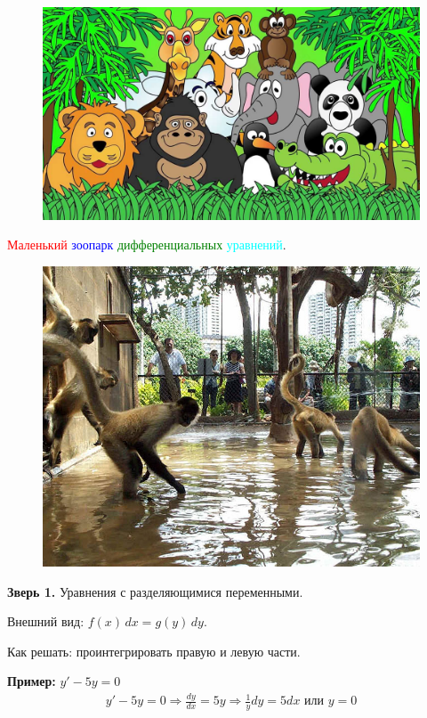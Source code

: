 \documentclass[10pt, a4paper]{article}
\begin{document}
\pagecolor{Tan}
\begin{figure}[h]
\centerline{\includegraphics[width=14cm]{all.jpg}}
\end{figure}
\centerline{\large{\textcolor{red}{Маленький} \textcolor{blue}{зоопарк} \textcolor{green}{дифференциальных} \textcolor{cyan}{уравнений}.}}
\newpage
\pagecolor{cyan}
{\begin{figure}[h]
\centerline{\includegraphics[width=12cm]{monkey.png}}
\end{figure}}
\par \textbf{Зверь 1.} Уравнения с разделяющимися переменными.
\par Внешний вид: $f(x) \, dx = g(y) \, dy$.
\par Как решать: проинтегрировать правую и левую части.
\par \textbf{Пример:} $y' - 5y = 0$
\begin{eqnarray*}
y' - 5y = 0 \Rightarrow \frac{dy}{dx} = 5y \Rightarrow \frac{1}{y}dy = 5 dx  \text{ или } y = 0
\end{eqnarray*}
\end{document}
